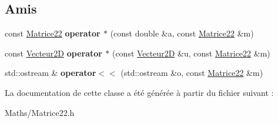 \subsection*{Amis}
\begin{DoxyCompactItemize}
\item 
\mbox{\label{class_matrice22_aa8e8813399d7b5b6b7c2318ec1867bd9}} 
const \mbox{\hyperlink{class_matrice22}{Matrice22}} {\bfseries operator $\ast$} (const double \&a, const \mbox{\hyperlink{class_matrice22}{Matrice22}} \&m)
\item 
\mbox{\label{class_matrice22_a4dfc2274b21872ab2db9471b941fc20e}} 
const \mbox{\hyperlink{class_vecteur2_d}{Vecteur2D}} {\bfseries operator $\ast$} (const \mbox{\hyperlink{class_vecteur2_d}{Vecteur2D}} \&u, const \mbox{\hyperlink{class_matrice22}{Matrice22}} \&m)
\item 
\mbox{\label{class_matrice22_ae011855287c25e07ed27203fdd0b92ed}} 
std\+::ostream \& {\bfseries operator$<$$<$} (std\+::ostream \&o, const \mbox{\hyperlink{class_matrice22}{Matrice22}} \&m)
\end{DoxyCompactItemize}


La documentation de cette classe a été générée à partir du fichier suivant \+:\begin{DoxyCompactItemize}
\item 
Maths/Matrice22.\+h\end{DoxyCompactItemize}
